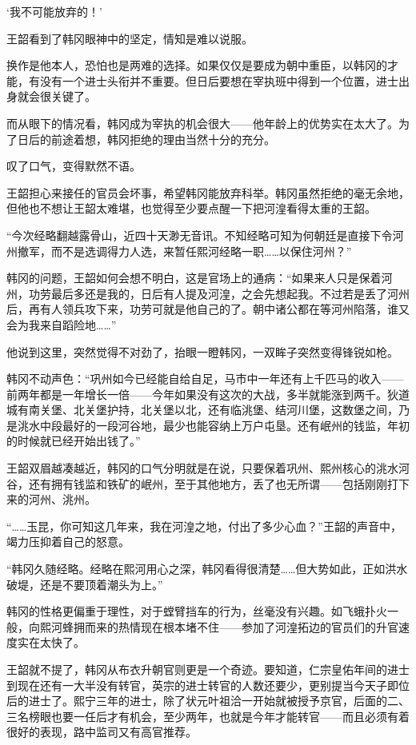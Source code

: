 ‘我不可能放弃的！’

王韶看到了韩冈眼神中的坚定，情知是难以说服。

换作是他本人，恐怕也是两难的选择。如果仅仅是要成为朝中重臣，以韩冈的才能，有没有一个进士头衔并不重要。但日后要想在宰执班中得到一个位置，进士出身就会很关键了。

而从眼下的情况看，韩冈成为宰执的机会很大——他年龄上的优势实在太大了。为了日后的前途着想，韩冈拒绝的理由当然十分的充分。

叹了口气，变得默然不语。

王韶担心来接任的官员会坏事，希望韩冈能放弃科举。韩冈虽然拒绝的毫无余地，但他也不想让王韶太难堪，也觉得至少要点醒一下把河湟看得太重的王韶。

“今次经略翻越露骨山，近四十天渺无音讯。不知经略可知为何朝廷是直接下令河州撤军，而不是选调得力人选，来暂任熙河经略一职……以保住河州？”

韩冈的问题，王韶如何会想不明白，这是官场上的通病：“如果来人只是保着河州，功劳最后多还是我的，日后有人提及河湟，之会先想起我。不过若是丢了河州后，再有人领兵攻下来，功劳可就是他自己的了。朝中诸公都在等河州陷落，谁又会为我来自蹈险地……”

他说到这里，突然觉得不对劲了，抬眼一瞪韩冈，一双眸子突然变得锋锐如枪。

韩冈不动声色：“巩州如今已经能自给自足，马市中一年还有上千匹马的收入——前两年都是一年增长一倍——今年如果没有这次的大战，多半就能涨到两千。狄道城有南关堡、北关堡护持，北关堡以北，还有临洮堡、结河川堡，这数堡之间，乃是洮水中段最好的一段河谷地，最少也能容纳上万户屯垦。还有岷州的钱监，年初的时候就已经开始出钱了。”

王韶双眉越凑越近，韩冈的口气分明就是在说，只要保着巩州、熙州核心的洮水河谷，还有拥有钱监和铁矿的岷州，至于其他地方，丢了也无所谓——包括刚刚打下来的河州、洮州。

“……玉昆，你可知这几年来，我在河湟之地，付出了多少心血？”王韶的声音中，竭力压抑着自己的怒意。

“韩冈久随经略。经略在熙河用心之深，韩冈看得很清楚……但大势如此，正如洪水破堤，还是不要顶着潮头为上。”

韩冈的性格更偏重于理性，对于螳臂挡车的行为，丝毫没有兴趣。如飞蛾扑火一般，向熙河蜂拥而来的热情现在根本堵不住——参加了河湟拓边的官员们的升官速度实在太快了。

王韶就不提了，韩冈从布衣升朝官则更是一个奇迹。要知道，仁宗皇佑年间的进士到现在还有一大半没有转官，英宗的进士转官的人数还要少，更别提当今天子即位后的进士了。熙宁三年的进士，除了状元叶祖洽一开始就被授予京官，后面的二、三名榜眼也要一任后才有机会，至少两年，也就是今年才能转官——而且必须有着很好的表现，路中监司又有高官推荐。

